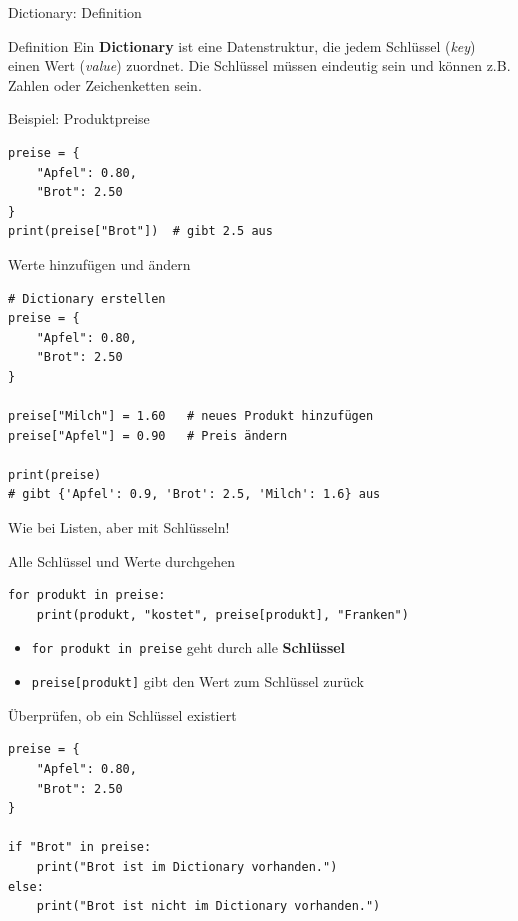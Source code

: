 \begin{frame}[fragile]{Dictionary: Definition}
	\begin{block}{Definition}
		Ein \textbf{Dictionary} ist eine Datenstruktur, die jedem Schlüssel (\textit{key}) einen Wert (\textit{value}) zuordnet. Die Schlüssel müssen eindeutig sein und können z.B. Zahlen oder Zeichenketten sein.
	\end{block}
\end{frame}

\begin{frame}[fragile]{Beispiel: Produktpreise}
	\begin{lstlisting}
preise = {
    "Apfel": 0.80,
    "Brot": 2.50
}
print(preise["Brot"])  # gibt 2.5 aus
	\end{lstlisting}
\end{frame}

\begin{frame}[fragile]{Werte hinzufügen und ändern}
	\begin{lstlisting}
# Dictionary erstellen
preise = {
    "Apfel": 0.80,
    "Brot": 2.50
}

preise["Milch"] = 1.60   # neues Produkt hinzufügen
preise["Apfel"] = 0.90   # Preis ändern

print(preise)
# gibt {'Apfel': 0.9, 'Brot': 2.5, 'Milch': 1.6} aus
	\end{lstlisting}
	\begin{center}
		Wie bei Listen, aber mit Schlüsseln!
	\end{center}
\end{frame}

\begin{frame}[fragile]{Alle Schlüssel und Werte durchgehen}
	\begin{lstlisting}[basicstyle=\ttfamily\footnotesize]
for produkt in preise:
    print(produkt, "kostet", preise[produkt], "Franken")
	\end{lstlisting}
	\begin{itemize}[<+->]
		\item \lstinline|for produkt in preise| geht durch alle \textbf{Schlüssel} 
		\item \lstinline|preise[produkt]| gibt den Wert zum Schlüssel zurück
	\end{itemize}
\end{frame}

\begin{frame}[fragile]{Überprüfen, ob ein Schlüssel existiert}
	\begin{lstlisting}
preise = {
	"Apfel": 0.80,
	"Brot": 2.50
}

if "Brot" in preise:
	print("Brot ist im Dictionary vorhanden.")
else:
	print("Brot ist nicht im Dictionary vorhanden.")
	\end{lstlisting}
\end{frame}

